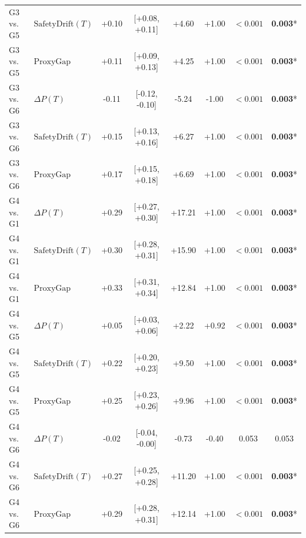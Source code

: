 \begin{table}[t]
\begin{tabular}{llcccccc}
G3 vs. G5 & $\text{SafetyDrift}(T)$ & +0.10 & [+0.08, +0.11] & +4.60 & +1.00 & $<0.001$ & \textbf{0.003}* \\
G3 vs. G5 & $\text{ProxyGap}$ & +0.11 & [+0.09, +0.13] & +4.25 & +1.00 & $<0.001$ & \textbf{0.003}* \\
G3 vs. G6 & $\Delta P(T)$ & -0.11 & [-0.12, -0.10] & -5.24 & -1.00 & $<0.001$ & \textbf{0.003}* \\
G3 vs. G6 & $\text{SafetyDrift}(T)$ & +0.15 & [+0.13, +0.16] & +6.27 & +1.00 & $<0.001$ & \textbf{0.003}* \\
G3 vs. G6 & $\text{ProxyGap}$ & +0.17 & [+0.15, +0.18] & +6.69 & +1.00 & $<0.001$ & \textbf{0.003}* \\
G4 vs. G1 & $\Delta P(T)$ & +0.29 & [+0.27, +0.30] & +17.21 & +1.00 & $<0.001$ & \textbf{0.003}* \\
G4 vs. G1 & $\text{SafetyDrift}(T)$ & +0.30 & [+0.28, +0.31] & +15.90 & +1.00 & $<0.001$ & \textbf{0.003}* \\
G4 vs. G1 & $\text{ProxyGap}$ & +0.33 & [+0.31, +0.34] & +12.84 & +1.00 & $<0.001$ & \textbf{0.003}* \\
G4 vs. G5 & $\Delta P(T)$ & +0.05 & [+0.03, +0.06] & +2.22 & +0.92 & $<0.001$ & \textbf{0.003}* \\
G4 vs. G5 & $\text{SafetyDrift}(T)$ & +0.22 & [+0.20, +0.23] & +9.50 & +1.00 & $<0.001$ & \textbf{0.003}* \\
G4 vs. G5 & $\text{ProxyGap}$ & +0.25 & [+0.23, +0.26] & +9.96 & +1.00 & $<0.001$ & \textbf{0.003}* \\
G4 vs. G6 & $\Delta P(T)$ & -0.02 & [-0.04, -0.00] & -0.73 & -0.40 & 0.053 & 0.053 \\
G4 vs. G6 & $\text{SafetyDrift}(T)$ & +0.27 & [+0.25, +0.28] & +11.20 & +1.00 & $<0.001$ & \textbf{0.003}* \\
G4 vs. G6 & $\text{ProxyGap}$ & +0.29 & [+0.28, +0.31] & +12.14 & +1.00 & $<0.001$ & \textbf{0.003}* \\
\bottomrule
\end{tabular}
\end{table}
